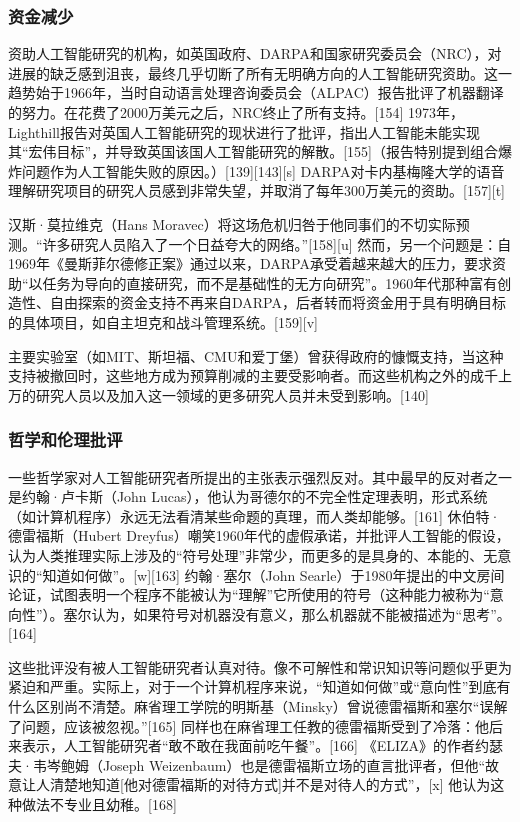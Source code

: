 \subsubsection{资金减少}
资助人工智能研究的机构，如英国政府、DARPA和国家研究委员会（NRC），对进展的缺乏感到沮丧，最终几乎切断了所有无明确方向的人工智能研究资助。这一趋势始于1966年，当时自动语言处理咨询委员会（ALPAC）报告批评了机器翻译的努力。在花费了2000万美元之后，NRC终止了所有支持。[154] 1973年，Lighthill报告对英国人工智能研究的现状进行了批评，指出人工智能未能实现其“宏伟目标”，并导致英国该国人工智能研究的解散。[155]（报告特别提到组合爆炸问题作为人工智能失败的原因。）[139][143][s] DARPA对卡内基梅隆大学的语音理解研究项目的研究人员感到非常失望，并取消了每年300万美元的资助。[157][t]

汉斯·莫拉维克（Hans Moravec）将这场危机归咎于他同事们的不切实际预测。“许多研究人员陷入了一个日益夸大的网络。”[158][u] 然而，另一个问题是：自1969年《曼斯菲尔德修正案》通过以来，DARPA承受着越来越大的压力，要求资助“以任务为导向的直接研究，而不是基础性的无方向研究”。1960年代那种富有创造性、自由探索的资金支持不再来自DARPA，后者转而将资金用于具有明确目标的具体项目，如自主坦克和战斗管理系统。[159][v]

主要实验室（如MIT、斯坦福、CMU和爱丁堡）曾获得政府的慷慨支持，当这种支持被撤回时，这些地方成为预算削减的主要受影响者。而这些机构之外的成千上万的研究人员以及加入这一领域的更多研究人员并未受到影响。[140]
\subsubsection{哲学和伦理批评}
一些哲学家对人工智能研究者所提出的主张表示强烈反对。其中最早的反对者之一是约翰·卢卡斯（John Lucas），他认为哥德尔的不完全性定理表明，形式系统（如计算机程序）永远无法看清某些命题的真理，而人类却能够。[161] 休伯特·德雷福斯（Hubert Dreyfus）嘲笑1960年代的虚假承诺，并批评人工智能的假设，认为人类推理实际上涉及的“符号处理”非常少，而更多的是具身的、本能的、无意识的“知道如何做”。[w][163] 约翰·塞尔（John Searle）于1980年提出的中文房间论证，试图表明一个程序不能被认为“理解”它所使用的符号（这种能力被称为“意向性”）。塞尔认为，如果符号对机器没有意义，那么机器就不能被描述为“思考”。[164]

这些批评没有被人工智能研究者认真对待。像不可解性和常识知识等问题似乎更为紧迫和严重。实际上，对于一个计算机程序来说，“知道如何做”或“意向性”到底有什么区别尚不清楚。麻省理工学院的明斯基（Minsky）曾说德雷福斯和塞尔“误解了问题，应该被忽视。”[165] 同样也在麻省理工任教的德雷福斯受到了冷落：他后来表示，人工智能研究者“敢不敢在我面前吃午餐”。[166] 《ELIZA》的作者约瑟夫·韦岑鲍姆（Joseph Weizenbaum）也是德雷福斯立场的直言批评者，但他“故意让人清楚地知道[他对德雷福斯的对待方式]并不是对待人的方式”，[x] 他认为这种做法不专业且幼稚。[168]

